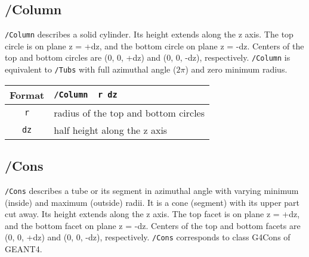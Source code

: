 \subsection{/Column}
\verb+/Column+ describes a solid cylinder.  
Its height extends along the z axis.
The     top    circle is on plane z = +dz,   
and the bottom circle    on plane z = -dz.
Centers of the top and bottom circles are   
(0, 0, +dz) and  (0, 0, -dz), respectively.
\verb+/Column+ is equivalent to \verb+/Tubs+   
with full azimuthal angle ($2\pi$) and zero minimum radius.  
\vspace{.20in}

\begin{tabular}{|c|l|}
\hline%
Format & \verb+/Column  r dz +\\
\hline%
\verb+r+   & radius of the top and bottom circles\\
\hline%
\verb+dz+  & half height along the z axis\\
\hline%
\end{tabular}


\subsection{/Cons}
\verb+/Cons+ describes a tube or its segment in azimuthal angle  
with varying minimum (inside) and maximum (outside) radii.
It is a cone (segment) with its upper part cut away.
Its height extends along the z axis.
The     top    facet is on plane z = +dz,   
and the bottom facet    on plane z = -dz.
Centers of the top and bottom facets are   
(0, 0, +dz) and  (0, 0, -dz), respectively.
\verb+/Cons+ corresponds to class G4Cons of GEANT4.
\vspace{.20in}

